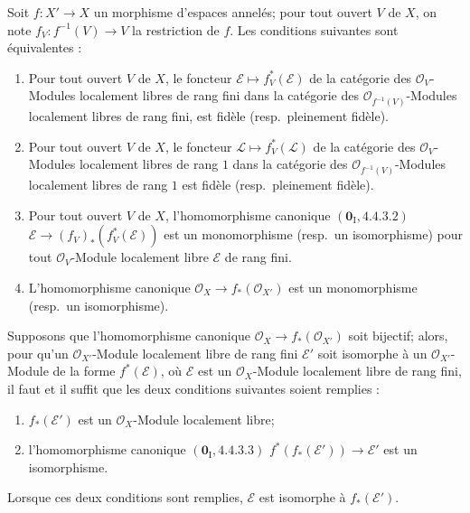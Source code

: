 \begin{lemma}[21.13.2]
\label{IV.21.13.2}
Soit $f:X'\to X$ un morphisme d'espaces annelés; pour tout ouvert $V$ de $X$, on
note $f_V:f^{-1}(V)\to V$ la restriction de $f$. Les conditions suivantes sont
équivalentes :
\begin{enumerate}[label=\emph{\alph*)}]
  \item Pour tout ouvert $V$ de $X$, le foncteur
  $\mathscr E\mapsto f_V^*(\mathscr E)$ de la catégorie des $\mathcal O_V$-Modules
  localement libres de rang fini dans la catégorie des
  $\mathcal O_{f^{-1}(V)}$-Modules localement libres de rang fini, est fidèle
  (resp.\ pleinement fidèle).
  \item[\emph{a')}] Pour tout ouvert $V$ de $X$, le foncteur
  $\mathscr L\mapsto f_V^*(\mathscr L)$ de la catégorie des $\mathcal O_V$-Modules
  localement libres de rang $1$ dans la catégorie des
  $\mathcal O_{f^{-1}(V)}$-Modules localement libres de rang $1$ est fidèle
  (resp.\ pleinement fidèle).
  \item Pour tout ouvert $V$ de $X$, l'homomorphisme canonique
  $(\mathbf 0_{\mathrm I}, 4.4.3.2)$
  $\mathscr E\to(f_V)_*(f_V^*(\mathscr E))$ est un monomorphisme
  (resp.\ un isomorphisme) pour tout $\mathcal O_V$-Module localement libre
  $\mathscr E$ de rang fini.
  \item[\emph{b')}] L'homomorphisme canonique
  $\mathcal O_X\to f_*(\mathcal O_{X'})$ est un monomorphisme
  (resp.\ un isomorphisme).
\end{enumerate}

Supposons que l'homomorphisme canonique $\mathcal O_X\to f_*(\mathcal O_{X'})$ soit
bijectif; alors, pour qu'un $\mathcal O_{X'}$-Module localement libre de rang fini
$\mathscr E'$ soit isomorphe à un $\mathcal O_{X'}$-Module de la forme
$f^*(\mathscr E)$, où $\mathscr E$ est un $\mathcal O_X$-Module localement libre de
rang fini, il faut et il suffit que les deux conditions suivantes soient remplies :
\begin{enumerate}[label=(\roman*)]
  \item $f_*(\mathscr E')$ est un $\mathcal O_X$-Module localement libre;
  \item l'homomorphisme canonique $(\mathbf 0_{\mathrm I}, 4.4.3.3)$
  $f^*(f_*(\mathscr E'))\to\mathscr E'$ est un isomorphisme.
\end{enumerate}
Lorsque ces deux conditions sont remplies, $\mathscr E$ est isomorphe à
$f_*(\mathscr E')$.
\end{lemma}

